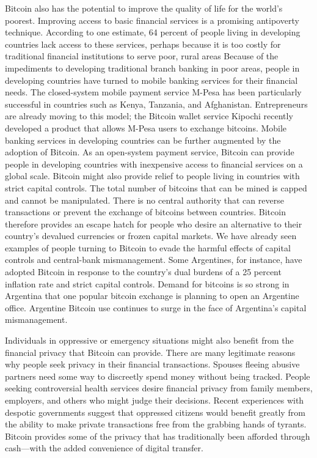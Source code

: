 Bitcoin also has the potential to improve the quality of life for the
world’s poorest. Improving access to basic financial services is a
promising antipoverty technique. According to one estimate,
64 percent of people living in developing countries lack access to
these services, perhaps because it is too costly for traditional financial
institutions to serve poor, rural areas Because of the impediments
to developing traditional branch banking in poor areas,
people in developing countries have turned to mobile banking services
for their financial needs. The closed-system mobile payment
service M-Pesa has been particularly successful in countries such
as Kenya, Tanzania, and Afghanistan. Entrepreneurs are already
moving to this model; the Bitcoin wallet service Kipochi recently
developed a product that allows M-Pesa users to exchange bitcoins.
Mobile banking services in developing countries can be
further augmented by the adoption of Bitcoin. As an open-system
payment service, Bitcoin can provide people in developing countries
with inexpensive access to financial services on a global scale.
Bitcoin might also provide relief to people living in countries
with strict capital controls. The total number of bitcoins
that can be mined is capped and cannot be manipulated. There
is no central authority that can reverse transactions or prevent
the exchange of bitcoins between countries. Bitcoin therefore
provides an escape hatch for people who desire an alternative
to their country’s devalued currencies or frozen capital markets.
We have already seen examples of people turning to Bitcoin to
evade the harmful effects of capital controls and central-bank
mismanagement. Some Argentines, for instance, have adopted
Bitcoin in response to the country’s dual burdens of a 25 percent
inflation rate and strict capital controls. Demand for bitcoins is
so strong in Argentina that one popular bitcoin exchange is planning
to open an Argentine office. Argentine Bitcoin use continues
to surge in the face of Argentina’s capital mismanagement.

Individuals in oppressive or emergency situations might
also benefit from the financial privacy that Bitcoin can provide.
There are many legitimate reasons why people seek privacy in
their financial transactions. Spouses fleeing abusive partners
need some way to discreetly spend money without being tracked.
People seeking controversial health services desire financial privacy
from family members, employers, and others who might
judge their decisions. Recent experiences with despotic
governments suggest that oppressed citizens would benefit greatly from
the ability to make private transactions free from the grabbing
hands of tyrants. Bitcoin provides some of the privacy that has
traditionally been afforded through cash—with the added convenience
of digital transfer\cite{bergstra2014bitcoin}.


